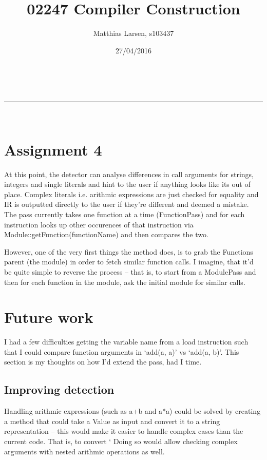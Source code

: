\documentclass[a4paper,11pt]{article}
\makeatletter
\newcommand{\linia}{\rule{\linewidth}{0.5pt}}
\theoremstyle{mytheor}
\renewcommand{\maketitle}{
\begin{center}
\vspace{2ex}
{\huge \textsc{\@title}}
\vspace{1ex}
\\
\linia\\
\@author \hfill \@date
\vspace{4ex}
\end{center}
}
\makeatother
\begin{document}
\title{02247 Compiler Construction}

\author{Matthias Larsen, s103437}

\date{27/04/2016}

\maketitle

\section*{Assignment 4}

At this point, the detector can analyse differences in call arguments for strings, integers and single literals and hint to the user if anything looks like its out of place.
Complex literals i.e. arithmic expressions are just checked for equality and IR is outputted directly to the user if they're different and deemed a mistake.
The pass currently takes one function at a time (FunctionPass) and for each instruction looks up other occurences of that instruction via Module::getFunction(functionName) and then compares the two.

However, one of the very first things the method does, is to grab the Functions parent (the module) in order to fetch similar function calls.
I imagine, that it'd be quite simple to reverse the process -- that is, to start from a ModulePass and then for each function in the module, ask the initial module for similar calls.

\section*{Future work}
I had a few difficulties getting the variable name from a load instruction such that I could compare function arguments in `add(a, a)' vs `add(a, b)'. This section is my thoughts on how I'd extend the pass, had I time.

\subsection*{Improving detection}
Handling arithmic expressions (such as a+b and a*a) could be solved by creating a method that could take a Value as input and convert it to a string representation -- this would make it easier to handle complex cases than the current code.
That is, to convert `%
Doing so would allow checking complex arguments with nested arithmic operations as well.
\end{document}
